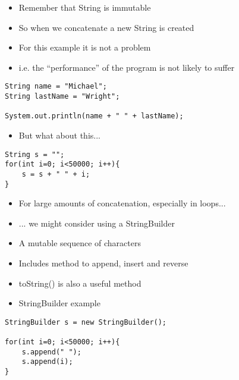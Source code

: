 \documentclass{beamer}
\begin{document}
\begin{frame}[fragile]
\begin{itemize}
\item Remember that String is immutable
\item So when we concatenate a new String is created
\item For this example it is not a problem
\item i.e. the ``performance'' of the program is not likely to suffer
\end{itemize}

\begin{block}{}
\begin{lstlisting}
String name = "Michael";
String lastName = "Wright";

System.out.println(name + " " + lastName);
\end{lstlisting}
\end{block}
\end{frame}

\begin{frame}[fragile]
\begin{itemize}
\item But what about this...
\end{itemize}
\begin{block}{}
\begin{lstlisting}
String s = "";
for(int i=0; i<50000; i++){
    s = s + " " + i;
}
\end{lstlisting}
\end{block}
\end{frame}

\begin{frame}
\begin{itemize}
\item For large amounts of concatenation, especially in loops...
\item ... we might consider using a StringBuilder
\bigskip
\item A mutable sequence of characters
\item Includes method to append, insert and reverse
\item toString() is also a useful method
\end{itemize}
\end{frame}

\begin{frame}[fragile]
\begin{itemize}
\item StringBuilder example
\end{itemize}
\begin{block}{}
\begin{lstlisting}
StringBuilder s = new StringBuilder();

for(int i=0; i<50000; i++){
    s.append(" ");
    s.append(i);        
}
\end{lstlisting}
\end{block}
\end{frame}
\end{document}
